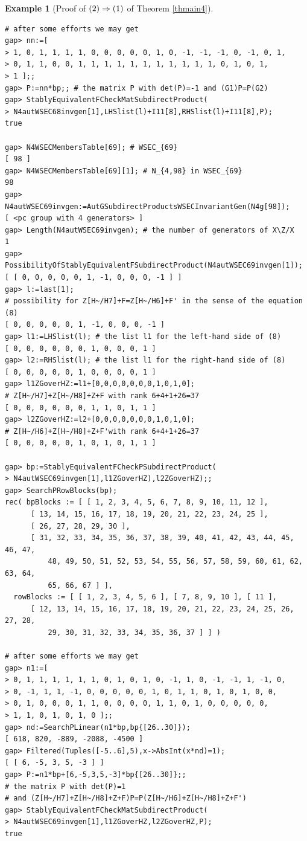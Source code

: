 \documentclass{amsart}
\theoremstyle{plain}
\theoremstyle{definition}
\newtheorem{example}[theorem]{Example}
\theoremstyle{remark}
\begin{document}
\begin{example}[Proof of ${\rm (2)}\Rightarrow {\rm (1)}$ of {Theorem \ref{thmain4}}]
\begin{verbatim}
# after some efforts we may get
gap> nn:=[ 
> 1, 0, 1, 1, 1, 1, 0, 0, 0, 0, 0, 1, 0, -1, -1, -1, 0, -1, 0, 1,
> 0, 1, 1, 0, 0, 1, 1, 1, 1, 1, 1, 1, 1, 1, 1, 1, 0, 1, 0, 1,
> 1 ];;
gap> P:=nn*bp;; # the matrix P with det(P)=-1 and (G1)P=P(G2)
gap> StablyEquivalentFCheckMatSubdirectProduct(
> N4autWSEC68invgen[1],LHSlist(l)+I11[8],RHSlist(l)+I11[8],P);
true

gap> N4WSECMembersTable[69]; # WSEC_{69}
[ 98 ]
gap> N4WSECMembersTable[69][1]; # N_{4,98} in WSEC_{69}
98
gap> N4autWSEC69invgen:=AutGSubdirectProductsWSECInvariantGen(N4g[98]);
[ <pc group with 4 generators> ]
gap> Length(N4autWSEC69invgen); # the number of generators of X\Z/X
1
gap> PossibilityOfStablyEquivalentFSubdirectProduct(N4autWSEC69invgen[1]);
[ [ 0, 0, 0, 0, 0, 1, -1, 0, 0, 0, -1 ] ]
gap> l:=last[1];
# possibility for Z[H~/H7]+F=Z[H~/H6]+F' in the sense of the equation (8)
[ 0, 0, 0, 0, 0, 1, -1, 0, 0, 0, -1 ]
gap> l1:=LHSlist(l); # the list l1 for the left-hand side of (8)
[ 0, 0, 0, 0, 0, 0, 1, 0, 0, 0, 1 ]
gap> l2:=RHSlist(l); # the list l1 for the right-hand side of (8)
[ 0, 0, 0, 0, 0, 1, 0, 0, 0, 0, 1 ]
gap> l1ZGoverHZ:=l1+[0,0,0,0,0,0,0,1,0,1,0]; 
# Z[H~/H7]+Z[H~/H8]+Z+F with rank 6+4+1+26=37
[ 0, 0, 0, 0, 0, 0, 1, 1, 0, 1, 1 ] 
gap> l2ZGoverHZ:=l2+[0,0,0,0,0,0,0,1,0,1,0]; 
# Z[H~/H6]+Z[H~/H8]+Z+F'with rank 6+4+1+26=37
[ 0, 0, 0, 0, 0, 1, 0, 1, 0, 1, 1 ]

gap> bp:=StablyEquivalentFCheckPSubdirectProduct(
> N4autWSEC69invgen[1],l1ZGoverHZ),l2ZGoverHZ);;
gap> SearchPRowBlocks(bp);
rec( bpBlocks := [ [ 1, 2, 3, 4, 5, 6, 7, 8, 9, 10, 11, 12 ], 
      [ 13, 14, 15, 16, 17, 18, 19, 20, 21, 22, 23, 24, 25 ], 
      [ 26, 27, 28, 29, 30 ], 
      [ 31, 32, 33, 34, 35, 36, 37, 38, 39, 40, 41, 42, 43, 44, 45, 46, 47, 
          48, 49, 50, 51, 52, 53, 54, 55, 56, 57, 58, 59, 60, 61, 62, 63, 64, 
          65, 66, 67 ] ], 
  rowBlocks := [ [ 1, 2, 3, 4, 5, 6 ], [ 7, 8, 9, 10 ], [ 11 ], 
      [ 12, 13, 14, 15, 16, 17, 18, 19, 20, 21, 22, 23, 24, 25, 26, 27, 28, 
          29, 30, 31, 32, 33, 34, 35, 36, 37 ] ] )

# after some efforts we may get
gap> n1:=[ 
> 0, 1, 1, 1, 1, 1, 1, 0, 1, 0, 1, 0, -1, 1, 0, -1, -1, 1, -1, 0,
> 0, -1, 1, 1, -1, 0, 0, 0, 0, 0, 1, 0, 1, 1, 0, 1, 0, 1, 0, 0,
> 0, 1, 0, 0, 0, 1, 1, 0, 0, 0, 0, 1, 1, 0, 1, 0, 0, 0, 0, 0,
> 1, 1, 0, 1, 0, 1, 0 ];;
gap> nd:=SearchPLinear(n1*bp,bp{[26..30]});
[ 618, 820, -889, -2088, -4500 ]
gap> Filtered(Tuples([-5..6],5),x->AbsInt(x*nd)=1);
[ [ 6, -5, 3, 5, -3 ] ]
gap> P:=n1*bp+[6,-5,3,5,-3]*bp{[26..30]};;
# the matrix P with det(P)=1 
# and (Z[H~/H7]+Z[H~/H8]+Z+F)P=P(Z[H~/H6]+Z[H~/H8]+Z+F')
gap> StablyEquivalentFCheckMatSubdirectProduct(
> N4autWSEC69invgen[1],l1ZGoverHZ,l2ZGoverHZ,P);
true


\end{verbatim}
\end{example}
\end{document}
